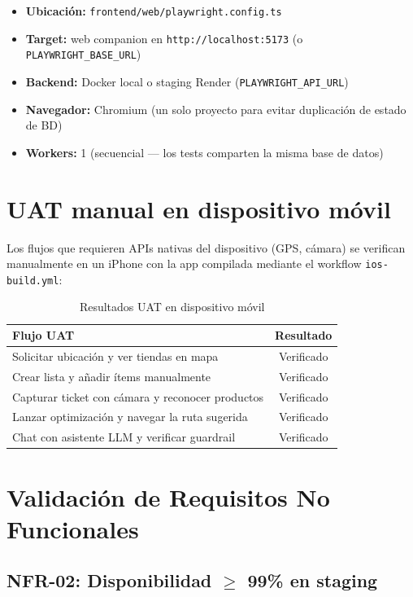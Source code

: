 \begin{itemize}
  \item \textbf{Ubicaci\'on:} \texttt{frontend/web/playwright.config.ts}
  \item \textbf{Target:} web companion en \texttt{http://localhost:5173} (o
    \texttt{PLAYWRIGHT\_BASE\_URL})
  \item \textbf{Backend:} Docker local o staging Render (\texttt{PLAYWRIGHT\_API\_URL})
  \item \textbf{Navegador:} Chromium (un solo proyecto para evitar duplicaci\'on de estado de BD)
  \item \textbf{Workers:} 1 (secuencial --- los tests comparten la misma base de datos)
\end{itemize}

\section{UAT manual en dispositivo m\'ovil}\label{sec:uat}

Los flujos que requieren APIs nativas del dispositivo (GPS, c\'amara) se verifican manualmente en
un iPhone con la app compilada mediante el workflow \texttt{ios-build.yml}:

\begin{table}[h]
\caption{Resultados UAT en dispositivo m\'ovil}
\label{tab:uat}
\centering
\begin{tabular}{|p{8cm}|c|}
\hline
\textbf{Flujo UAT} & \textbf{Resultado} \\
\hline
Solicitar ubicaci\'on y ver tiendas en mapa & Verificado \\
Crear lista y a\~nadir \'items manualmente & Verificado \\
Capturar ticket con c\'amara y reconocer productos & Verificado \\
Lanzar optimizaci\'on y navegar la ruta sugerida & Verificado \\
Chat con asistente LLM y verificar guardrail & Verificado \\
\hline
\end{tabular}
\end{table}

\section{Validaci\'on de Requisitos No Funcionales}\label{sec:nfr}

\subsection{NFR-02: Disponibilidad $\geq$ 99\% en staging}\label{subsec:nfr02}

